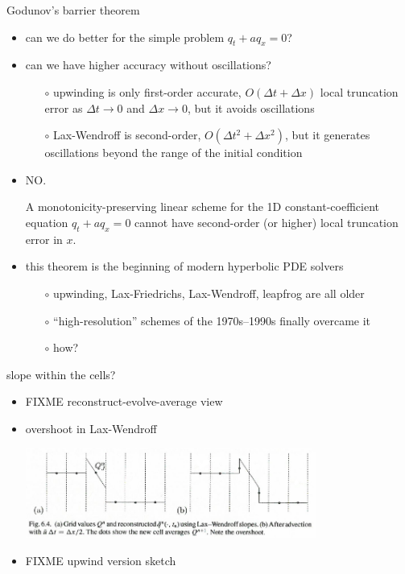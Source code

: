 \documentclass[10pt,hyperref]{beamer}
\begin{document}
\begin{frame}{Godunov's barrier theorem}

\begin{itemize}
\item can we do better for the simple problem $q_t + a q_x=0$?
\item can we have higher accuracy without oscillations?
    \begin{itemize}
    \item[$\circ$] upwinding is only first-order accurate, $O(\Delta t + \Delta x)$ local truncation error as $\Delta t\to 0$ and $\Delta x \to 0$, but it avoids oscillations
    \item[$\circ$] Lax-Wendroff is second-order, $O(\Delta t^2 + \Delta x^2)$, but it generates oscillations beyond the range of the initial condition
    \end{itemize}
\item \alert{NO.}

\begin{theorem}  A monotonicity-preserving \alert<2>{linear} scheme for the 1D constant-coefficient equation $q_t + a q_x=0$ cannot have second-order (or higher) local truncation error in $x$.\end{theorem}

\item this theorem is the beginning of modern hyperbolic PDE solvers
    \begin{itemize}
    \item[$\circ$] upwinding, Lax-Friedrichs, Lax-Wendroff, leapfrog are all older
    \item[$\circ$] ``high-resolution'' schemes of the 1970s--1990s finally overcame it
    \item[$\circ$] \alert{how?}
    \end{itemize}
\end{itemize}
\end{frame}


\begin{frame}{slope within the cells?}

\begin{itemize}
\item FIXME reconstruct-evolve-average view
\item overshoot in Lax-Wendroff

\hfill \includegraphics[width=0.75\textwidth]{figs/leveque6p4}
\item FIXME upwind version sketch
\end{itemize}
\end{frame}
\end{document}
